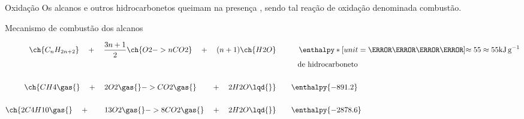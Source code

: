 \documentclass[presentation,professionalfonts,aspectratio=169]{beamer}
\begin{document}
\begin{frame}[label={sec:org4b2ed5f}]{Oxidação}
Os \alert{alcanos} e outros \alert{hidrocarbonetos} queimam na presença , sendo tal reação de oxidação denominada
\alert{combustão}.


\begin{bclogo}[couleur=blue!30 , arrondi=0.1 , logo=\bcplume , epBarre=3.5]{Mecanismo de combustão dos alcanos}


\begin{align*}
\ch{C_nH_{2n+2}} \quad + \quad  \frac{3n+1}{2}\ch{O2 -> n CO2}\quad +\quad (n+1)\ch{H2O} & \qquad \quad \enthalpy*[unit=\kilo\joule\per\gram]{\approx 55} \approx 55 \unit{\kilo\joule\per\gram}\\ & \hspace{1cm} \mathrm{de~hidrocarboneto} \\ \\
\ch{CH4\gas{} \quad{} + \quad{} 2 O2\gas{} -> CO2\gas{} \qquad{} + \quad{} 2 H2O\lqd{}} & \quad \quad \enthalpy{-891.2}\\ \\
	\ch{2 C4H10\gas{} \quad{} + \qquad{} 13 O2\gas{} -> 8 CO2\gas{} \quad{} + \quad{} 2 H2O\lqd{}} & \quad \quad \enthalpy{-2878.6}    
\end{align*}
\end{bclogo}
\end{frame}
\end{document}
